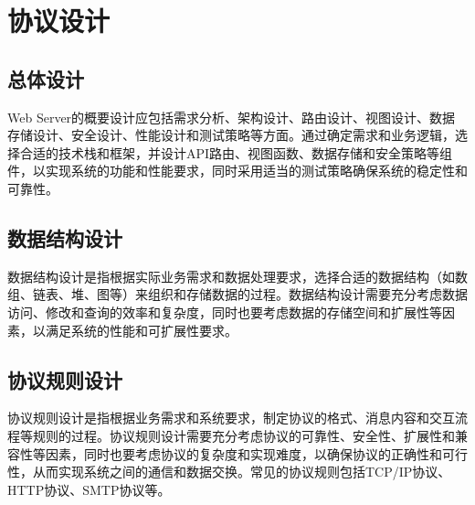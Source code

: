 \chapter{协议设计}
\section{总体设计}
Web Server的概要设计应包括需求分析、架构设计、路由设计、视图设计、数据存储设计、安全设计、性能设计和测试策略等方面。通过确定需求和业务逻辑，选择合适的技术栈和框架，并设计API路由、视图函数、数据存储和安全策略等组件，以实现系统的功能和性能要求，同时采用适当的测试策略确保系统的稳定性和可靠性。

\section{数据结构设计}
数据结构设计是指根据实际业务需求和数据处理要求，选择合适的数据结构（如数组、链表、堆、图等）来组织和存储数据的过程。数据结构设计需要充分考虑数据访问、修改和查询的效率和复杂度，同时也要考虑数据的存储空间和扩展性等因素，以满足系统的性能和可扩展性要求。

\section{协议规则设计}
协议规则设计是指根据业务需求和系统要求，制定协议的格式、消息内容和交互流程等规则的过程。协议规则设计需要充分考虑协议的可靠性、安全性、扩展性和兼容性等因素，同时也要考虑协议的复杂度和实现难度，以确保协议的正确性和可行性，从而实现系统之间的通信和数据交换。常见的协议规则包括TCP/IP协议、HTTP协议、SMTP协议等。


